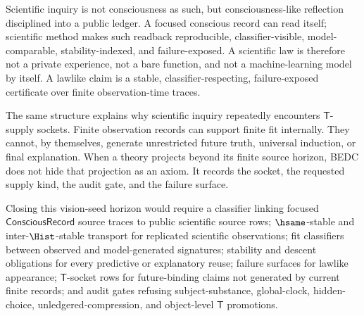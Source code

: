 \begin{remark}[Reading]
\label{rem:scientific-inquiry-conscious-t-reading}
Scientific inquiry is not consciousness as such, but consciousness-like
reflection disciplined into a public ledger. A focused conscious record
can read itself; scientific method makes such readback reproducible,
classifier-visible, model-comparable, stability-indexed, and
failure-exposed. A scientific law is therefore not a private experience,
not a bare function, and not a machine-learning model by itself. A
lawlike claim is a stable, classifier-respecting, failure-exposed
certificate over finite observation-time traces.

The same structure explains why scientific inquiry repeatedly encounters
$\mathsf{T}$-supply sockets. Finite observation records can support finite
fit internally. They cannot, by themselves, generate unrestricted future
truth, universal induction, or final explanation. When a theory projects
beyond its finite source horizon, BEDC does not hide that projection as
an axiom. It records the socket, the requested supply kind, the audit
gate, and the failure surface.
\end{remark}

\begin{remark}
\label{rem:scientific-inquiry-conscious-t-closure-obligations}
Closing this vision-seed horizon would require a classifier linking
focused $\mathsf{ConsciousRecord}$ source traces to public scientific
source rows; $\hsame$-stable and inter-$\Hist$-stable transport for
replicated scientific observations; fit classifiers between observed and
model-generated signatures; stability and descent obligations for every
predictive or explanatory reuse; failure surfaces for lawlike appearance;
$\mathsf{T}$-socket rows for future-binding claims not generated by
current finite records; and audit gates refusing subject-substance,
global-clock, hidden-choice, unledgered-compression, and object-level
$\mathsf{T}$ promotions.
\end{remark}

